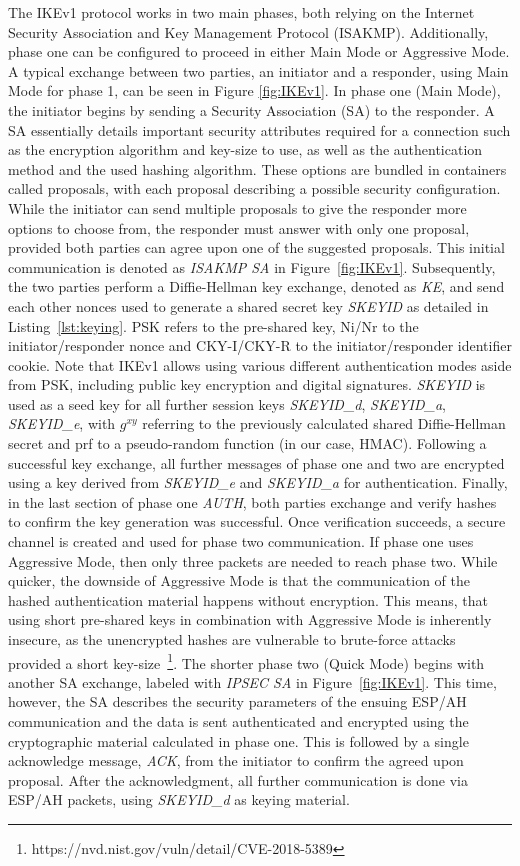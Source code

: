 The IKEv1 protocol works in two main phases, both relying on the Internet Security Association and Key Management Protocol (ISAKMP). Additionally, phase one can be configured to proceed in either Main Mode or Aggressive Mode. A typical exchange between two parties, an initiator and a responder, using Main Mode for phase 1, can be seen in Figure \ref{fig:IKEv1}. In phase one (Main Mode), the initiator begins by sending a Security Association (SA) to the responder. A SA essentially details important security attributes required for a connection such as the encryption algorithm and key-size to use, as well as the authentication method and the used hashing algorithm. These options are bundled in containers called proposals, with each proposal describing a possible security configuration. While the initiator can send multiple proposals to give the responder more options to choose from, the responder must answer with only one proposal, provided both parties can agree upon one of the suggested proposals. This initial communication is denoted as \emph{ISAKMP SA} in Figure~\ref{fig:IKEv1}. Subsequently, the two parties perform a Diffie-Hellman key exchange, denoted as \emph{KE}, and send each other nonces used to generate a shared secret key \emph{SKEYID} as detailed in Listing~\ref{lst:keying}. PSK refers to the pre-shared key, Ni/Nr to the initiator/responder nonce and CKY-I/CKY-R to the initiator/responder identifier cookie. Note that IKEv1 allows using various different authentication modes aside from PSK, including public key encryption and digital signatures. \emph{SKEYID} is used as a seed key for all further session keys \emph{SKEYID\_d}, \emph{SKEYID\_a}, \emph{SKEYID\_e}, with $g^{xy}$ referring to the previously calculated shared Diffie-Hellman secret and prf to a pseudo-random function (in our case, HMAC). Following a successful key exchange, all further messages of phase one and two are encrypted using a key derived from \emph{SKEYID\_e} and \emph{SKEYID\_a} for authentication. Finally, in the last section of phase one \emph{AUTH}, both parties exchange and verify hashes to confirm the key generation was successful. Once verification succeeds, a secure channel is created and used for phase two communication. If phase one uses Aggressive Mode, then only three packets are needed to reach phase two. While quicker, the downside of Aggressive Mode is that the communication of the hashed authentication material happens without encryption. This means, that using short pre-shared keys in combination with Aggressive Mode is inherently insecure, as the unencrypted hashes are vulnerable to brute-force attacks provided a short key-size~\footnote{https://nvd.nist.gov/vuln/detail/CVE-2018-5389}. The shorter phase two (Quick Mode) begins with another SA exchange, labeled with \emph{IPSEC SA} in Figure~\ref{fig:IKEv1}. This time, however, the SA describes the security parameters of the ensuing ESP/AH communication and the data is sent authenticated and encrypted using the cryptographic material calculated in phase one. This is followed by a single acknowledge message, \emph{ACK}, from the initiator to confirm the agreed upon proposal. After the acknowledgment, all further communication is done via ESP/AH packets, using \emph{SKEYID\_d} as keying material.

